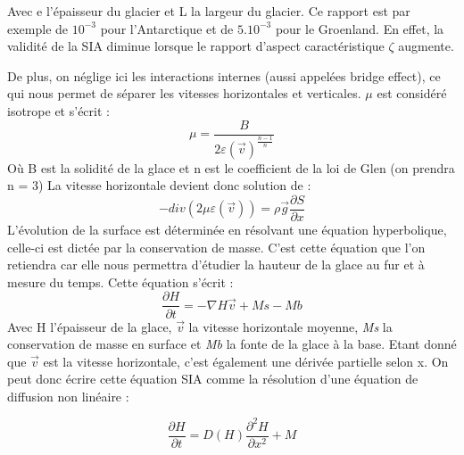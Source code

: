 \documentclass{article}
\begin{document}
Avec e l'épaisseur du glacier et L la largeur du glacier. Ce rapport est par exemple de $10^{-3}$ pour l'Antarctique et de $5.10^{-3}$ pour le Groenland. En effet, la validité de la SIA diminue lorsque le rapport d'aspect caractéristique $\zeta$ augmente. 

De plus, on néglige ici les interactions internes (aussi appelées bridge effect), ce qui nous permet de séparer les vitesses horizontales et verticales. $\mu$ est considéré isotrope et s'écrit :
\begin{equation}
\mu = \frac{B}{2\varepsilon(\vec{v})^\frac{n-1}{n}}
\label{eq2}      
\end{equation}
Où B est la solidité de la glace et n est le coefficient de la loi de Glen (on prendra n = 3)
\newline
La vitesse horizontale devient donc solution de :
\begin{equation}
-div(2 \mu \varepsilon(\vec{v}))  = \rho \vec{g}\frac{{\partial}S}{\partial x}
\label{eq3}
\end{equation}
L'évolution de la surface est déterminée en résolvant une équation hyperbolique, celle-ci est dictée par la conservation de masse. C'est cette équation que l'on retiendra car elle nous permettra d'étudier la hauteur de la glace au fur et à mesure du temps.
Cette équation s'écrit :
\begin{equation}
\frac{\partial H}{\partial t}=-\nabla H\vec{v} + Ms - Mb
\label{eq3}
\end{equation}
Avec H l'épaisseur de la glace, $\vec{v}$ la vitesse horizontale moyenne, \textit{Ms} la conservation de masse en surface et \textit{Mb} la fonte de la glace à la base.
Etant donné que $\vec{v}$ est la vitesse horizontale, c'est également une dérivée partielle selon x.
On peut donc écrire cette équation SIA comme la résolution d'une équation de diffusion non linéaire : 

\begin{equation}
\frac{\partial H}{\partial t}=D(H)\frac{{\partial}^{2}H}{\partial x^{2}} + M
\label{eq4}
\end{equation}
\end{document}
